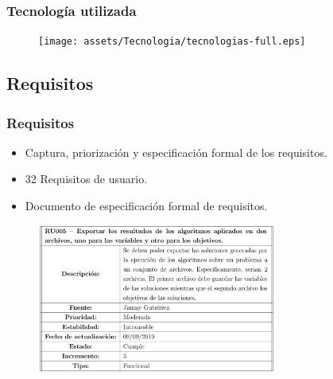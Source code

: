 \documentclass[9pt]{beamer}
\begin{document}
    \begin{frame}
        \frametitle{Tecnología utilizada}  
        \begin{figure}[H]
            \centering
            \texttt{[image: assets/Tecnologia/tecnologias-full.eps]}
        \end{figure}               


    \end{frame}

    \subsection{Requisitos}
    \begin{frame}
        \frametitle{Requisitos}                 
        
        \begin{itemize}
            \item Captura, priorización y especificación formal de los requisitos.
            \item 32 Requisitos de usuario.
            \item Documento de especificación formal de requisitos.
        \end{itemize}
        \begin{figure}
            \includegraphics[width=0.7\textwidth]{assets/Requisito.png}
        \end{figure}
    \end{frame}
\end{document}
